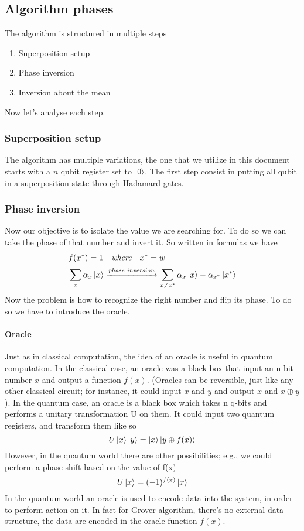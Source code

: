 \documentclass[main.tex]{subfiles}
\theoremstyle{definition}
\begin{document}
\subsection{Algorithm phases}
The algorithm is structured in multiple steps \begin{enumerate}
\item Superposition setup
\item Phase inversion
\item Inversion about the mean
\end{enumerate}
Now let's analyse each step.
\subsubsection{Superposition setup}
The algorithm has multiple variations, the one that we utilize in this document starts with a $n$ qubit register set to $\ket{0}$.
The first step consist in putting all qubit in a superposition state through Hadamard gates.
\subsubsection{Phase inversion}
Now our objective is to isolate the value we are searching for. To do so we can take the phase of that number and invert it. So written in formulas we have
\begin{align*}
& f(x^{*})=1 \quad\textit{where} \quad x^{*}=w \\
& \sum_{x}^{}\alpha_{x}\ket{x}  \xrightarrow{\textit{phase inversion}} \sum_{x\neq x^{*}}^{}\alpha_{x}\ket{x}-\alpha_{x^{*}}\ket{x^{*}}
\end{align*}
Now the problem is how to recognize the right number and flip its phase. To do so we have to introduce the oracle.
\paragraph{Oracle} 
Just as in classical computation, the idea of an oracle is
useful in quantum computation. In the classical case,
an oracle was a black box that input an n-bit number $x$
and output a function $f(x)$. (Oracles can be reversible,
just like any other classical circuit; for instance, it could
input $x$ and $y$ and output $x$ and $x\oplus y$).
In the quantum case, an oracle is a black box which
takes n q-bits and performs a unitary transformation U on them. It could input two quantum registers, and
transform them like so 
$$U\ket{x}\ket{y} = \ket{x}\ket{y \oplus f(x)}$$
However, in the quantum world there are other possibilities; e.g., we could perform a phase shift based on the value of f(x)
$$U\ket{x} = (-1)^{f(x)}\ket{x}$$
In the quantum world an oracle is used to encode data into the system, in order to perform action on it. In fact for Grover algorithm, there's no external data structure, the data are encoded in the oracle function $f(x)$.
\end{document}

